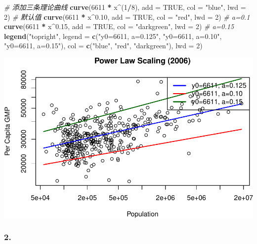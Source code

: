 \documentclass[
]{article}
\newenvironment{Shaded}{\begin{snugshade}}{\end{snugshade}}
\newcommand{\AttributeTok}[1]{\textcolor[rgb]{0.13,0.29,0.53}{#1}}
\newcommand{\CommentTok}[1]{\textcolor[rgb]{0.56,0.35,0.01}{\textit{#1}}}
\newcommand{\ConstantTok}[1]{\textcolor[rgb]{0.56,0.35,0.01}{#1}}
\newcommand{\DecValTok}[1]{\textcolor[rgb]{0.00,0.00,0.81}{#1}}
\newcommand{\FloatTok}[1]{\textcolor[rgb]{0.00,0.00,0.81}{#1}}
\newcommand{\FunctionTok}[1]{\textcolor[rgb]{0.13,0.29,0.53}{\textbf{#1}}}
\newcommand{\NormalTok}[1]{#1}
\newcommand{\SpecialCharTok}[1]{\textcolor[rgb]{0.81,0.36,0.00}{\textbf{#1}}}
\newcommand{\StringTok}[1]{\textcolor[rgb]{0.31,0.60,0.02}{#1}}
\begin{document}
\begin{Shaded}
\begin{Highlighting}[]
\CommentTok{\# 添加三条理论曲线}
\FunctionTok{curve}\NormalTok{(}\DecValTok{6611} \SpecialCharTok{*}\NormalTok{ x}\SpecialCharTok{\^{}}\NormalTok{(}\DecValTok{1}\SpecialCharTok{/}\DecValTok{8}\NormalTok{), }\AttributeTok{add =} \ConstantTok{TRUE}\NormalTok{, }\AttributeTok{col =} \StringTok{"blue"}\NormalTok{, }\AttributeTok{lwd =} \DecValTok{2}\NormalTok{)      }\CommentTok{\# 默认值}
\FunctionTok{curve}\NormalTok{(}\DecValTok{6611} \SpecialCharTok{*}\NormalTok{ x}\SpecialCharTok{\^{}}\FloatTok{0.10}\NormalTok{, }\AttributeTok{add =} \ConstantTok{TRUE}\NormalTok{, }\AttributeTok{col =} \StringTok{"red"}\NormalTok{, }\AttributeTok{lwd =} \DecValTok{2}\NormalTok{)        }\CommentTok{\# a=0.1}
\FunctionTok{curve}\NormalTok{(}\DecValTok{6611} \SpecialCharTok{*}\NormalTok{ x}\SpecialCharTok{\^{}}\FloatTok{0.15}\NormalTok{, }\AttributeTok{add =} \ConstantTok{TRUE}\NormalTok{, }\AttributeTok{col =} \StringTok{"darkgreen"}\NormalTok{, }\AttributeTok{lwd =} \DecValTok{2}\NormalTok{)  }\CommentTok{\# a=0.15}
\FunctionTok{legend}\NormalTok{(}\StringTok{"topright"}\NormalTok{, }\AttributeTok{legend =} \FunctionTok{c}\NormalTok{(}\StringTok{"y0=6611, a=0.125"}\NormalTok{, }\StringTok{"y0=6611, a=0.10"}\NormalTok{, }\StringTok{"y0=6611, a=0.15"}\NormalTok{),}
       \AttributeTok{col =} \FunctionTok{c}\NormalTok{(}\StringTok{"blue"}\NormalTok{, }\StringTok{"red"}\NormalTok{, }\StringTok{"darkgreen"}\NormalTok{), }\AttributeTok{lwd =} \DecValTok{2}\NormalTok{)}
\end{Highlighting}
\end{Shaded}

\includegraphics{Homework-03_files/figure-latex/unnamed-chunk-1-1.pdf}

\subsubsection{2.}\label{section-1}
\end{document}
